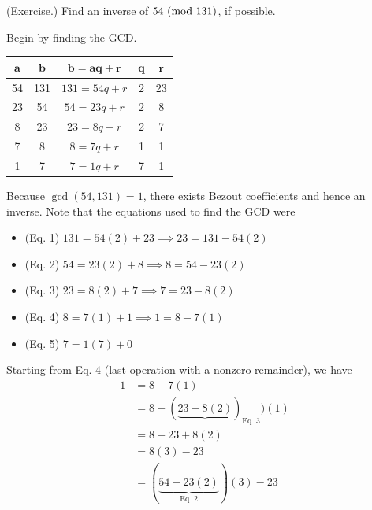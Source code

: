 \documentclass[letterpaper]{article}
\newcommand{\0}{\mathbf{0}}
\begin{document}
\begin{mdframed}
    (Exercise.) Find an inverse of $54 \ (\mathrm{mod}\ 131)$, if possible. 

    \begin{mdframed}
        Begin by finding the GCD. 
        \begin{center}
            \begin{tabular}{|c|c|c|c|c|}
                \hline 
                $\mathbf{a}$ & $\mathbf{b}$ & $\mathbf{b = aq + r}$ & $\mathbf{q}$ & $\mathbf{r}$ \\ 
                \hline
                54 & 131 & $131 = 54q + r$ & 2 & 23 \\ 
                23 & 54 & $54 = 23q + r$ & 2 & 8 \\ 
                8 & 23 & $23 = 8q + r$ & 2 & 7 \\
                7 & 8 & $8 = 7q + r$ & 1 & 1 \\
                1 & 7 & $7 = 1q + r$ & 7 & 1 \\  
                \hline 
            \end{tabular}
        \end{center}
        Because $\gcd(54, 131) = 1$, there exists Bezout coefficients and hence an inverse. Note that the equations used to find the GCD were 
        \begin{itemize}
            \item (Eq. 1) $131 = 54(2) + 23 \implies 23 = 131 - 54(2)$
            \item (Eq. 2) $54 = 23(2) + 8 \implies 8 = 54 - 23(2)$ 
            \item (Eq. 3) $23 = 8(2) + 7 \implies 7 = 23 - 8(2)$
            \item (Eq. 4) $8 = 7(1) + 1 \implies 1 = 8 - 7(1)$
            \item (Eq. 5) $7 = 1(7) + 0$
        \end{itemize}
        Starting from Eq. 4 (last operation with a nonzero remainder), we have 
        \begin{equation*}
            \begin{aligned}
                1 &= 8 - 7(1) \\ 
                    &= 8 - (\underbrace{23 - 8(2)})_{\text{Eq. 3}})(1) \\ 
                    &= 8 - 23 + 8(2) \\ 
                    &= 8(3) - 23 \\ 
                    &= (\underbrace{54 - 23(2)}_{\text{Eq. 2}})(3) - 23 \\ 

\end{aligned}
\end{equation*}
\end{mdframed}
\end{mdframed}
\end{document}
